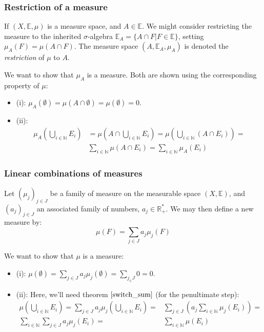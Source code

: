 \documentclass[12pt, a4paper]{article}
\numberwithin{equation}{section}
\begin{document}
\subsubsection{Restriction of a measure}
\label{restriction_of_measure}
If $(X,\mathbb{E},\mu)$ is a measure space, and $A\in\mathbb{E}$. We might consider restricting the measure to the inherited $\sigma$-algebra $\mathbb{E}_A=\{A\cap F|F\in\mathbb{E}\}$, setting $\mu_A(F)=\mu(A\cap F)$. The measure space $(A,\mathbb{E}_A,\mu_A)$ is denoted the \textit{restriction} of $\mu$ to $A$.

We want to show that $\mu_A$ is a measure. Both are shown using the corresponding property of $\mu$:
\begin{itemize}
\item (i): $\mu_A(\emptyset)=\mu(A\cap\emptyset)=\mu(\emptyset)=0$.
\item (ii): 
\begin{align*}
\mu_A\left(\bigcup_{i\in\mathbb{N}} E_i\right)&=\mu\left(A\cap\bigcup_{i\in\mathbb{N}} E_i\right)=\mu\left(\bigcup_{i\in\mathbb{N}}(A\cap E_i)\right)=\\
&\sum_{i\in\mathbb{N}}\mu(A\cap E_i)=\sum_{i\in\mathbb{N}}\mu_A(E_i)
\end{align*}
\end{itemize}

\subsubsection{Linear combinations of measures}
\label{linear_combination_measure}
Let $(\mu_j)_{j\in J}$ be a family of measure on the measurable space $(X,\mathbb{E})$, and $(a_j)_{j\in J}$ an associated family of numbers, $a_j\in\mathbb{R}^*_+$. We may then define a new measure by:
\begin{equation}
\mu(F)=\sum_{j\in J}a_j\mu_j(F)
\end{equation}

We want to show that $\mu$ is a measure:
\begin{itemize}
\item (i): $\mu(\emptyset)=\sum_{j\in J} a_j\mu_j(\emptyset)=\sum_{j_\in J}0=0$.
\item (ii): Here, we'll need theorem $\ref{switch_sum}$ (for the penultimate step):
\begin{align*}
\mu\left(\bigcup_{i\in\mathbb{N}} E_i\right)=\sum_{j\in J} a_j\mu_j\left(\bigcup_{i\in\mathbb{N}} E_i\right)=&\sum_{j\in J}\left(a_j\sum_{i\in\mathbb{N}}\mu_j(E_i)\right)=\\
\sum_{i\in\mathbb{N}}\sum_{j\in J}a_j\mu_j(E_i)=&\sum_{i\in\mathbb{N}}\mu(E_i)
\end{align*}
\end{itemize}
\end{document}
